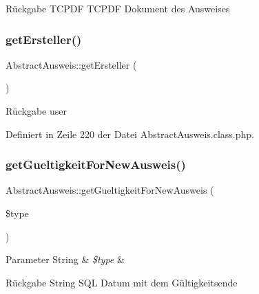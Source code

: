 \begin{DoxyReturn}{Rückgabe}
T\+C\+P\+DF T\+C\+P\+DF Dokument des Ausweises 
\end{DoxyReturn}
\mbox{\label{class_abstract_ausweis_adb047c042d27a59c3e019ea7749c0465}} 
\subsubsection{\texorpdfstring{get\+Ersteller()}{getErsteller()}}
{\footnotesize\ttfamily Abstract\+Ausweis\+::get\+Ersteller (\begin{DoxyParamCaption}{ }\end{DoxyParamCaption})}

\begin{DoxyReturn}{Rückgabe}
user 
\end{DoxyReturn}


Definiert in Zeile 220 der Datei Abstract\+Ausweis.\+class.\+php.

\mbox{\label{class_abstract_ausweis_a3fdf082a0932510420d85a3c3932eeeb}} 
\subsubsection{\texorpdfstring{get\+Gueltigkeit\+For\+New\+Ausweis()}{getGueltigkeitForNewAusweis()}}
{\footnotesize\ttfamily Abstract\+Ausweis\+::get\+Gueltigkeit\+For\+New\+Ausweis (\begin{DoxyParamCaption}\item[{}]{\$type }\end{DoxyParamCaption})\hspace{0.3cm}{\ttfamily [abstract]}}


\begin{DoxyParams}[1]{Parameter}
String & {\em \$type} & \\
\hline
\end{DoxyParams}
\begin{DoxyReturn}{Rückgabe}
String S\+QL Datum mit dem Gültigkeitsende 
\end{DoxyReturn}
\mbox{\label{class_abstract_ausweis_a05eb44a25eb180ca23d6d8ed0ec35312}} 
